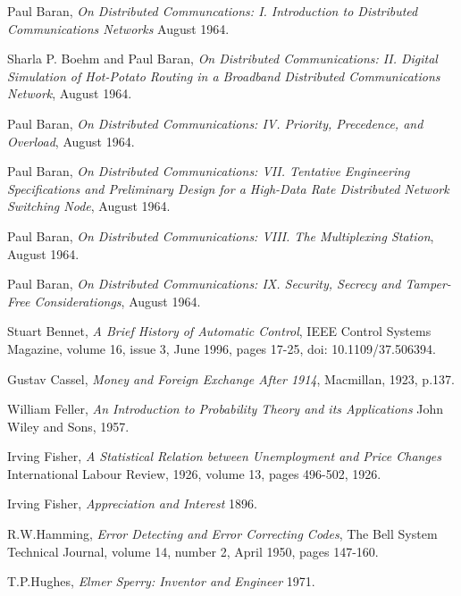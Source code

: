 \begin{thebibliography}{9}

    Paul Baran,
    \emph{On Distributed Communcations: I. Introduction to Distributed Communications Networks}
    August 1964.

    Sharla P. Boehm and Paul Baran,
    \emph{On Distributed Communications: II. Digital Simulation of Hot-Potato Routing in a Broadband
        Distributed Communications Network},
    August 1964.

    Paul Baran,
    \emph{On Distributed Communications: IV. Priority, Precedence, and Overload},
    August 1964.

    Paul Baran,
    \emph{On Distributed Communications: VII. Tentative Engineering Specifications and Preliminary
        Design for a High-Data Rate Distributed Network Switching Node},
    August 1964.

    Paul Baran,
    \emph{On Distributed Communications: VIII. The Multiplexing Station},
    August 1964.

    Paul Baran,
    \emph{On Distributed Communications: IX. Security, Secrecy and Tamper-Free Considerationgs},
    August 1964.

    Stuart Bennet,
    \emph{A Brief History of Automatic Control},
    IEEE Control Systems Magazine,
    volume 16,
    issue 3,
    June 1996,
    pages 17-25,
    doi: 10.1109/37.506394.

    Gustav Cassel,
    \emph{Money and Foreign Exchange After 1914},
    Macmillan,
    1923,
    p.137.

    William Feller,
    \emph{An Introduction to Probability Theory and its Applications}
    John Wiley and Sons,
    1957.

    Irving Fisher, 
    \emph{A Statistical Relation between Unemployment and Price Changes}
    International Labour Review,
    1926,
    volume 13,
    pages 496-502,
    1926.

    Irving Fisher,
    \emph{Appreciation and Interest}
    1896.

    R.W.Hamming,
    \emph{Error Detecting and Error Correcting Codes},
    The Bell System Technical Journal,
    volume 14,
    number 2,
    April 1950,
    pages 147-160.

    T.P.Hughes,
    \emph{Elmer Sperry: Inventor and Engineer}
    1971.


\end{thebibliography}
